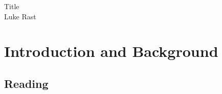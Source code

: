 \documentclass{article}[10pt]      %
\begin{document}
\begingroup  
  \centering
  \LARGE Title \\[1.5em]
  \large Luke Rast\par
\endgroup


\section{Introduction and Background}
\subsection{Reading}






\end{document}

